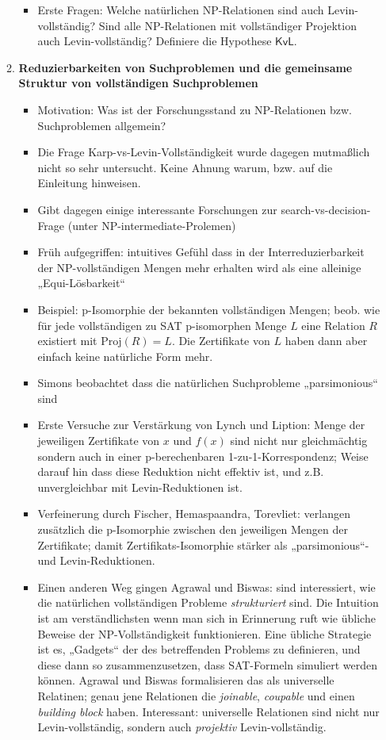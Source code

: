 \documentclass[nofonts]{uebung}
\begin{document}
\begin{enumerate}[label*=\arabic*.]
\begin{enumerate}[label*=\arabic*.]
\begin{itemize}
                    \item Erste Fragen: Welche natürlichen NP-Relationen sind auch Levin-vollständig? Sind alle NP-Relationen mit vollständiger Projektion auch Levin-vollständig? Definiere die Hypothese $\mathsf{KvL}$.
                \end{itemize}
            \item \textbf{Reduzierbarkeiten von Suchproblemen und die gemeinsame Struktur von vollständigen Suchproblemen}
                \begin{itemize}
                    \item Motivation: Was ist der Forschungsstand zu NP-Relationen bzw. Suchproblemen allgemein?
                    \item Die Frage Karp-vs-Levin-Vollständigkeit wurde dagegen mutmaßlich nicht so sehr untersucht. Keine Ahnung warum, bzw. auf die Einleitung hinweisen.
                    \item Gibt dagegen einige interessante Forschungen zur search-vs-decision-Frage (unter NP-intermediate-Prolemen)
                    \item Früh aufgegriffen: intuitives Gefühl dass in der Interreduzierbarkeit der NP-vollständigen Mengen mehr erhalten wird als eine alleinige „Equi-Lösbarkeit“
                    \item Beispiel: p-Isomorphie der bekannten vollständigen Mengen; beob. wie für jede vollständigen zu SAT p-isomorphen Menge $L$ eine Relation $R$ existiert mit $\mathrm{Proj}(R)=L$. Die Zertifikate von $L$ haben dann aber einfach keine natürliche Form mehr.
                    \item Simons beobachtet dass die natürlichen Suchprobleme „parsimonious“ sind
                    \item Erste Versuche zur Verstärkung von  Lynch und Liption: Menge der jeweiligen Zertifikate von $x$ und $f(x)$ sind nicht nur gleichmächtig sondern auch in einer p-berechenbaren 1-zu-1-Korrespondenz; Weise darauf hin dass diese Reduktion nicht effektiv ist, und z.B. unvergleichbar mit Levin-Reduktionen ist.
                    \item Verfeinerung durch Fischer, Hemaspaandra, Torevliet: verlangen zusätzlich die p-Isomorphie zwischen den jeweiligen Mengen der Zertifikate; damit Zertifikats-Isomorphie stärker als „parsimonious“- und Levin-Reduktionen.
                    \item Einen anderen Weg gingen Agrawal und Biswas: sind interessiert, wie die natürlichen vollständigen Probleme \emph{strukturiert} sind. Die Intuition ist am verständlichsten wenn man sich in Erinnerung ruft wie übliche Beweise der NP-Vollständigkeit funktionieren. Eine übliche Strategie ist es, „Gadgets“ der des betreffenden Problems zu definieren, und diese dann so zusammenzusetzen, dass  SAT-Formeln simuliert werden können. Agrawal und Biswas formalisieren das als universelle Relatinen; genau jene Relationen die \emph{joinable}, \emph{coupable} und einen \emph{building block} haben. Interessant: universelle Relationen sind nicht nur Levin-vollständig, sondern auch \emph{projektiv} Levin-vollständig.  

\end{itemize}
\end{enumerate}
\end{enumerate}
\end{document}

